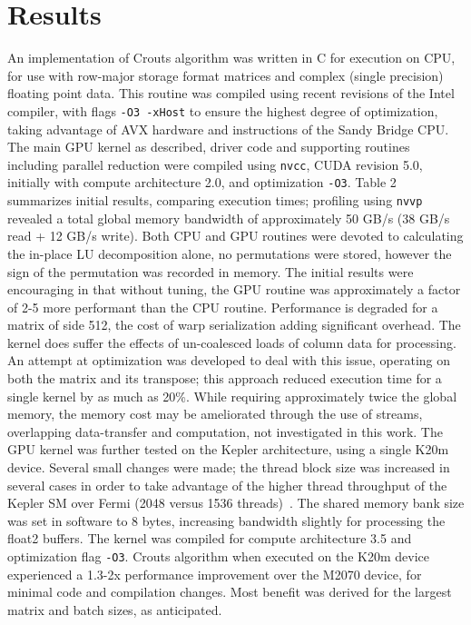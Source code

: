 \documentclass[letter, 12pt]{article}
\begin{document}
\section{Results}
An implementation of Crouts algorithm was written in C for execution on CPU, for use with row-major storage format matrices and complex (single precision) floating point data. This routine was compiled using recent revisions of the Intel compiler, with flags {\tt -O3 -xHost} to ensure the highest degree of optimization, taking advantage of AVX hardware and instructions of the Sandy Bridge CPU. The main GPU kernel as described, driver code and supporting routines including parallel reduction were compiled using {\tt nvcc}, CUDA revision 5.0, initially with compute architecture 2.0, and optimization {\tt -O3}. Table 2 summarizes initial results, comparing execution times; profiling using {\tt nvvp} revealed a total global memory bandwidth of approximately 50 GB/s (38 GB/s read + 12 GB/s write). Both CPU and GPU routines were devoted to calculating the in-place LU decomposition alone, no permutations were stored, however the sign of the permutation was recorded in memory. The initial results were encouraging in that without tuning, the GPU routine was approximately a factor of 2-5 more performant than the CPU routine. Performance is degraded for a matrix of side 512, the cost of warp serialization adding significant overhead. The kernel does suffer the effects of un-coalesced loads of column data for processing. An attempt at optimization was developed to deal with this issue, operating on both the matrix and its transpose; this approach reduced execution time for a single kernel by as much as 20\%. While requiring approximately twice the global memory, the memory cost may be ameliorated through the use of streams, overlapping data-transfer and computation, not investigated in this work. The GPU kernel was further tested on the Kepler architecture, using a single K20m device. Several small changes were made; the thread block size was increased in several cases in order to take advantage of the higher thread throughput of the Kepler SM over Fermi (2048 versus 1536 threads)~\cite{kep}. The shared memory bank size was set in software to 8 bytes, increasing bandwidth slightly for processing the float2 buffers. The kernel was compiled for compute architecture 3.5 and optimization flag {\tt -O3}. Crouts algorithm when executed on the K20m device experienced a 1.3-2x performance improvement over the M2070 device, for minimal code and compilation changes. Most benefit was derived for the largest matrix and batch sizes, as anticipated.
\end{document}
